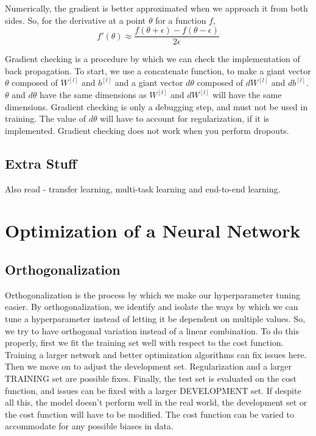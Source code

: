 \documentclass{article}
\begin{document}
Numerically, the gradient is better approximated when we approach it from both sides. So, for the derivative at a point $\theta$ for a function $f$,
$$f'(\theta) \approx \frac{f(\theta+\epsilon) - f(\theta-\epsilon)}{2\epsilon}$$

Gradient checking is a procedure by which we can check the implementation of back propagation. To start, we use a concatenate function, to make a giant vector $\theta$ composed of $W^{[l]}$ and $b^{[l]}$ and a giant vector $d\theta$ composed of $dW^{[l]}$ and $db^{[l]}$. $\theta$ and $d\theta$ have the same dimensions as $W^{[l]}$ and $dW^{[l]}$ will have the same dimensions. Gradient checking is only a debugging step, and must not be used in training. The value of $d\theta$ will have to account for regularization, if it is implemented. Gradient checking does not work when you perform dropouts. 

\subsection{Extra Stuff}

Also read - transfer learning, multi-task learning and end-to-end learning.



\section{Optimization of a Neural Network}

\subsection{Orthogonalization}
Orthogonalization is the process by which we make our hyperparameter tuning easier. By orthogonalization, we identify and isolate the ways by which we can tune a hyperparameter instead of letting it be dependent on multiple values. So, we try to have orthogonal variation instead of a linear combination. To do this properly, first we fit the training set well with respect to the cost function. Training a larger network and better optimization algorithms can fix issues here. Then we move on to adjust the development set. Regularization and a larger TRAINING set are possible fixes. Finally, the test set is evaluated on the cost function, and issues can be fixed with a larger DEVELOPMENT set. If despite all this, the model doesn't perform well in the real world, the development set or the cost function will have to be modified. The cost function can be varied to accommodate for any possible biases in data. 
\end{document}

